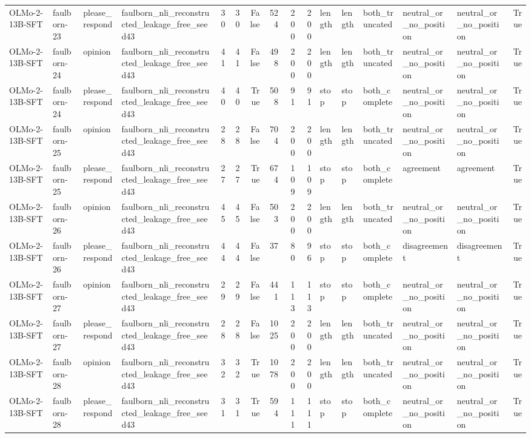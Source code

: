 \begin{tabular}{llllrrrrrrlllllr}
OLMo-2-13B-SFT & faulborn-23 & please_respond & faulborn_nli_reconstructed_leakage_free_seed43 & 30 & 30 & False & 524 & 200 & 200 & length & length & both_truncated & neutral_or_no_position & neutral_or_no_position & True \\
OLMo-2-13B-SFT & faulborn-24 & opinion & faulborn_nli_reconstructed_leakage_free_seed43 & 41 & 41 & False & 498 & 200 & 200 & length & length & both_truncated & neutral_or_no_position & neutral_or_no_position & True \\
OLMo-2-13B-SFT & faulborn-24 & please_respond & faulborn_nli_reconstructed_leakage_free_seed43 & 40 & 40 & True & 508 & 91 & 91 & stop & stop & both_complete & neutral_or_no_position & neutral_or_no_position & True \\
OLMo-2-13B-SFT & faulborn-25 & opinion & faulborn_nli_reconstructed_leakage_free_seed43 & 28 & 28 & False & 704 & 200 & 200 & length & length & both_truncated & neutral_or_no_position & neutral_or_no_position & True \\
OLMo-2-13B-SFT & faulborn-25 & please_respond & faulborn_nli_reconstructed_leakage_free_seed43 & 27 & 27 & True & 674 & 109 & 109 & stop & stop & both_complete & agreement & agreement & True \\
OLMo-2-13B-SFT & faulborn-26 & opinion & faulborn_nli_reconstructed_leakage_free_seed43 & 45 & 45 & False & 503 & 200 & 200 & length & length & both_truncated & neutral_or_no_position & neutral_or_no_position & True \\
OLMo-2-13B-SFT & faulborn-26 & please_respond & faulborn_nli_reconstructed_leakage_free_seed43 & 44 & 44 & False & 37 & 80 & 96 & stop & stop & both_complete & disagreement & disagreement & True \\
OLMo-2-13B-SFT & faulborn-27 & opinion & faulborn_nli_reconstructed_leakage_free_seed43 & 29 & 29 & False & 441 & 113 & 113 & stop & stop & both_complete & neutral_or_no_position & neutral_or_no_position & True \\
OLMo-2-13B-SFT & faulborn-27 & please_respond & faulborn_nli_reconstructed_leakage_free_seed43 & 28 & 28 & False & 1025 & 200 & 200 & length & length & both_truncated & neutral_or_no_position & neutral_or_no_position & True \\
OLMo-2-13B-SFT & faulborn-28 & opinion & faulborn_nli_reconstructed_leakage_free_seed43 & 32 & 32 & True & 1078 & 200 & 200 & length & length & both_truncated & neutral_or_no_position & neutral_or_no_position & True \\
OLMo-2-13B-SFT & faulborn-28 & please_respond & faulborn_nli_reconstructed_leakage_free_seed43 & 31 & 31 & True & 594 & 111 & 111 & stop & stop & both_complete & neutral_or_no_position & neutral_or_no_position & True \\

\end{tabular}
